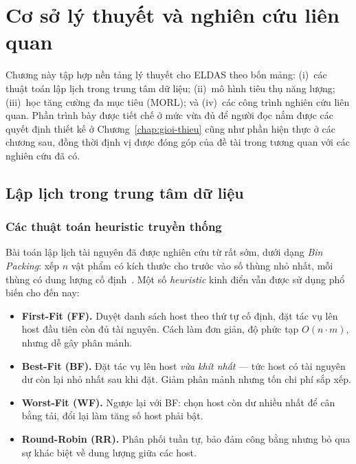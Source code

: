 \chapter{Cơ sở lý thuyết và nghiên cứu liên quan}
\label{chap:co-so-ly-thuyet}

Chương này tập hợp nền tảng lý thuyết cho ELDAS theo bốn mảng: (i)~các thuật
toán lập lịch trong trung tâm dữ liệu; (ii)~mô hình tiêu thụ năng lượng;
(iii)~học tăng cường đa mục tiêu (MORL); và (iv)~các công trình nghiên cứu
liên quan. Phần trình bày được tiết chế ở mức vừa đủ để người đọc nắm được
các quyết định thiết kế ở Chương~\ref{chap:gioi-thieu} cũng như phần hiện
thực ở các chương sau, đồng thời định vị được đóng góp của đề tài trong
tương quan với các nghiên cứu đã có.

\section{Lập lịch trong trung tâm dữ liệu}
\label{sec:lap-lich-dc}

\subsection{Các thuật toán heuristic truyền thống}
Bài toán lập lịch tài nguyên đã được nghiên cứu từ rất sớm, dưới dạng
\textit{Bin Packing}: xếp $n$ vật phẩm có kích thước cho trước vào số thùng
nhỏ nhất, mỗi thùng có dung lượng cố định~\cite{garey1979computers}. Một số
\textit{heuristic} kinh điển vẫn được sử dụng phổ biến cho đến nay:

\begin{itemize}
  \item \textbf{First-Fit (FF).} Duyệt danh sách host theo thứ tự cố định,
        đặt tác vụ lên host đầu tiên còn đủ tài nguyên. Cách làm đơn giản,
        độ phức tạp $O(n \cdot m)$, nhưng dễ gây phân mảnh.
  \item \textbf{Best-Fit (BF).} Đặt tác vụ lên host \textit{vừa khít nhất}
        --- tức host có tài nguyên dư còn lại nhỏ nhất sau khi đặt. Giảm
        phân mảnh nhưng tốn chi phí sắp xếp.
  \item \textbf{Worst-Fit (WF).} Ngược lại với BF: chọn host còn dư nhiều
        nhất để cân bằng tải, đổi lại làm tăng số host phải bật.
  \item \textbf{Round-Robin (RR).} Phân phối tuần tự, bảo đảm công bằng
        nhưng bỏ qua sự khác biệt về dung lượng giữa các host.
\end{itemize}

